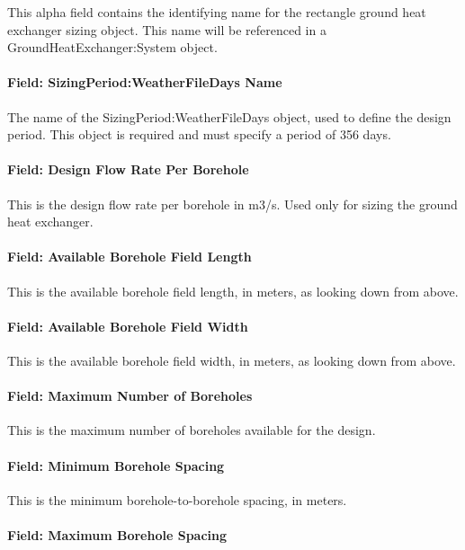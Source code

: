 This alpha field contains the identifying name for the rectangle ground heat exchanger sizing object.
This name will be referenced in a GroundHeatExchanger:System object.

\paragraph{Field: SizingPeriod:WeatherFileDays Name}

The name of the SizingPeriod:WeatherFileDays object, used to define the design period.
This object is required and must specify a period of 356 days.

\paragraph{Field: Design Flow Rate Per Borehole}

This is the design flow rate per borehole in m3/s.
Used only for sizing the ground heat exchanger.

\paragraph{Field: Available Borehole Field Length}

This is the available borehole field length, in meters, as looking down from above.

\paragraph{Field: Available Borehole Field Width}

This is the available borehole field width, in meters, as looking down from above.

\paragraph{Field: Maximum Number of Boreholes}

This is the maximum number of boreholes available for the design.

\paragraph{Field: Minimum Borehole Spacing}

This is the minimum borehole-to-borehole spacing, in meters.

\paragraph{Field: Maximum Borehole Spacing}

